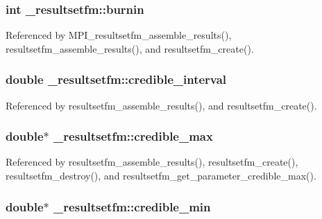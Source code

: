 \subsubsection[{\texorpdfstring{burnin}{burnin}}]{\setlength{\rightskip}{0pt plus 5cm}int \+\_\+resultsetfm\+::burnin}\hypertarget{struct__resultsetfm_af2baadf20847f573ddab38052d43354a}{}\label{struct__resultsetfm_af2baadf20847f573ddab38052d43354a}


Referenced by M\+P\+I\+\_\+resultsetfm\+\_\+assemble\+\_\+results(), resultsetfm\+\_\+assemble\+\_\+results(), and resultsetfm\+\_\+create().

\subsubsection[{\texorpdfstring{credible\+\_\+interval}{credible_interval}}]{\setlength{\rightskip}{0pt plus 5cm}double \+\_\+resultsetfm\+::credible\+\_\+interval}\hypertarget{struct__resultsetfm_a13f6eaaac5b3a4b6d60d71e43392c7f8}{}\label{struct__resultsetfm_a13f6eaaac5b3a4b6d60d71e43392c7f8}


Referenced by resultsetfm\+\_\+assemble\+\_\+results(), and resultsetfm\+\_\+create().

\subsubsection[{\texorpdfstring{credible\+\_\+max}{credible_max}}]{\setlength{\rightskip}{0pt plus 5cm}double$\ast$ \+\_\+resultsetfm\+::credible\+\_\+max}\hypertarget{struct__resultsetfm_a046d3a408cc9e597d4846731fa1fc717}{}\label{struct__resultsetfm_a046d3a408cc9e597d4846731fa1fc717}


Referenced by resultsetfm\+\_\+assemble\+\_\+results(), resultsetfm\+\_\+create(), resultsetfm\+\_\+destroy(), and resultsetfm\+\_\+get\+\_\+parameter\+\_\+credible\+\_\+max().

\subsubsection[{\texorpdfstring{credible\+\_\+min}{credible_min}}]{\setlength{\rightskip}{0pt plus 5cm}double$\ast$ \+\_\+resultsetfm\+::credible\+\_\+min}\hypertarget{struct__resultsetfm_a9aac08a6a424785ff64965e2e5d41a61}{}\label{struct__resultsetfm_a9aac08a6a424785ff64965e2e5d41a61}


